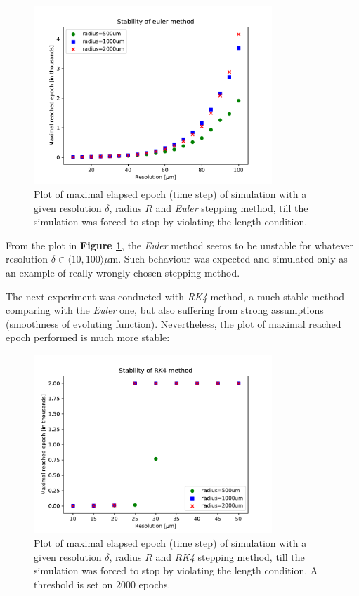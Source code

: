 \begin{figure}[h]
	\centering
	\includegraphics[width=0.8\textwidth]{graphics/results/stability-euler}
	\caption{Plot of maximal elapsed epoch (time step) of simulation with a given resolution $\delta$, radius $R$ and \textit{Euler} stepping method, till the simulation was forced to stop by violating the length condition.}
	\label{stab-euler}
\end{figure}


From the plot in \textbf{Figure \ref{stab-euler}}, the \textit{Euler} method seems to be unstable for whatever resolution $\delta \in \langle 10, 100 \rangle \mu\text{m}$. Such behaviour was expected and simulated only as an example of really wrongly chosen stepping method.

The next experiment was conducted with \textit{RK4} method, a much stable method comparing with the \textit{Euler} one, but also suffering from strong assumptions (smoothness of evoluting function). Nevertheless, the plot of maximal reached epoch performed is much more stable:

\begin{figure}[h]
	\centering
	\includegraphics[width=0.8\textwidth]{graphics/results/stability-RK4}
	\caption{Plot of maximal elapsed epoch (time step) of simulation with a given resolution $\delta$, radius $R$ and \textit{RK4} stepping method, till the simulation was forced to stop by violating the length condition. A threshold is set on $2000$ epochs.}
\end{figure}

